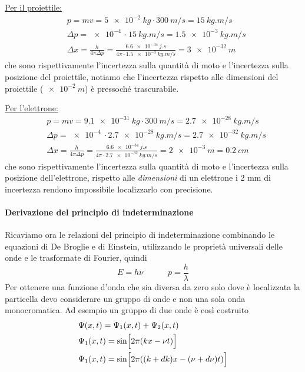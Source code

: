 \underline{Per il proiettile:}
\begin{equation}
\begin{split}
& p = m v = \SI{5e-2}{kg} \cdot \SI{300}{m/s} = \SI{15}{kg.m/s} \\
& \Delta p = \SI{e-4}{} \cdot \SI{15}{kg.m/s} = \SI{1.5e-3}{kg.m/s} \\
& \Delta x = \frac{ h}{4\pi \Delta p } = \frac{ \SI{6.6e-34}{j.s}}{4\pi \cdot \SI{1.5e-3}{kg.m/s} } = \SI{3e-32}{m}
\end{split}
\end{equation}
che sono rispettivamente l'incertezza sulla quantità di moto e l'incertezza sulla posizione del proiettile, notiamo che l'incertezza rispetto alle dimensioni del proiettile ($\SI{e-2}{m}$) è pressoché trascurabile.

\underline{Per l'elettrone:}
\begin{equation}
\begin{split}
& p = m v = \SI{9.1e-31}{kg} \cdot \SI{300}{m/s} = \SI{2.7e-28}{kg.m/s} \\
& \Delta p = \SI{e-4}{} \cdot \SI{2.7e-28}{kg.m/s} = \SI{2.7e-32}{kg.m/s} \\
& \Delta x = \frac{ h}{4\pi \Delta p } = \frac{ \SI{6.6e-34}{j.s}}{4\pi \cdot \SI{2.7e-32}{kg.m/s} } = \SI{2e-3}{m} = \SI{0.2}{cm}
\end{split}
\end{equation}
che sono rispettivamente l'incertezza sulla quantità di moto e l'incertezza sulla posizione dell'elettrone, rispetto alle \textit{dimensioni} di un elettrone i 2 mm di incertezza rendono impossibile localizzarlo con precisione.

\paragraph{Derivazione del principio di indeterminazione}
Ricaviamo ora le relazioni del principio di indeterminazione combinando le equazioni di De Broglie e di Einstein, utilizzando le proprietà universali delle onde e le trasformate di Fourier, quindi
\begin{equation}
E = h \nu \quad\quad\quad p = \frac{ h}{\lambda }
\label{dualita_oc}
\end{equation}
Per ottenere una funzione d'onda che sia diversa da zero solo dove è localizzata la particella devo considerare un gruppo di onde e non una sola onda monocromatica.
Ad esempio un gruppo di due onde è così costruito
\begin{equation}
\begin{split}
& \Psi(x,t) = \Psi_1(x,t) + \Psi_2(x,t) \\
& \Psi_1(x,t) = \sin \Bigl[  2\pi (kx -\nu t)  \Bigr] \\
& \Psi_1(x,t) = \sin \Bigl[  2\pi ((k + dk) x - (\nu +d\nu) t)  \Bigr]
\end{split}
\label{eq_onde_gen}
\end{equation}

